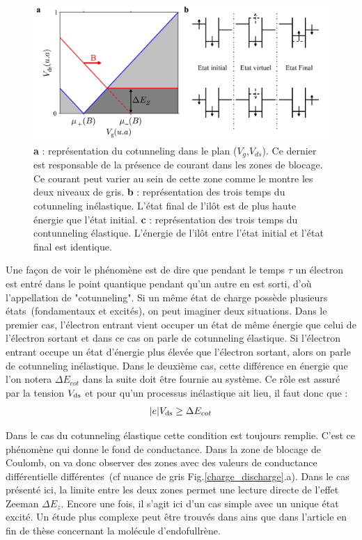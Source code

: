 \begin{figure}
\includegraphics[scale=0.5]{Theorie/Transport/figure5/figure5.pdf} 
\caption{\textbf{a} : représentation du cotunneling dans le plan ($V_g$,$V_{ds}$). Ce dernier est responsable de la présence de courant dans les zones de blocage. Ce courant peut varier au sein de cette zone comme le montre les deux niveaux de gris. \textbf{b} : représentation des trois temps du cotunneling inélastique. L'état final de l'il\^ot est de plus haute énergie que l'état initial. \textbf{c} :  représentation des trois temps du contunneling élastique. L'énergie de l'il\^ot entre l'état initial et l'état final est identique.}
\label{cotun}
\end{figure}


Une façon de voir le phénomène est de dire que pendant le temps $\tau$ un électron est entré dans le point quantique pendant qu'un autre en est sorti, d'où l'appellation de "cotunneling". Si un m\^eme état de charge possède plusieurs états~(fondamentaux et excités), on peut imaginer deux situations. Dans le premier cas, l'électron entrant vient occuper un état de m\^eme énergie que celui de l'électron sortant et dans ce cas on parle de cotunneling élastique. Si l'électron entrant occupe un état d'énergie plus élevée que l'électron sortant, alors on parle de cotunneling inélastique. Dans le deuxième cas, cette différence en énergie que l'on notera $\Delta E_{cot}$ dans la suite doit être fournie au système. Ce rôle est assuré par la tension $V_{\rm{ds}}$ et pour qu'un processus inélastique ait lieu, il faut donc que :
\begin{eqnarray}
|e|V_{\rm{ds}} \geq \Delta E_{cot}
\end{eqnarray}

Dans le cas du cotunneling élastique cette condition est toujours remplie. C'est ce phénomène qui donne le fond de conductance. Dans la zone de blocage de Coulomb, on va donc observer des zones avec des valeurs de conductance différentielle différentes~(cf nuance de gris Fig.\ref{charge_discharge}.a). Dans le cas présenté ici, la limite entre les deux zones permet une lecture directe de l'effet Zeeman $\Delta E_z$. Encore une fois, il s'agit ici d'un cas simple avec un unique état excité. Un étude plus complexe peut \^etre trouvés dans \cite{DeFranceschi2001} ains que dans l'article en fin de thèse concernant la molécule d'endofullrène.\newline

